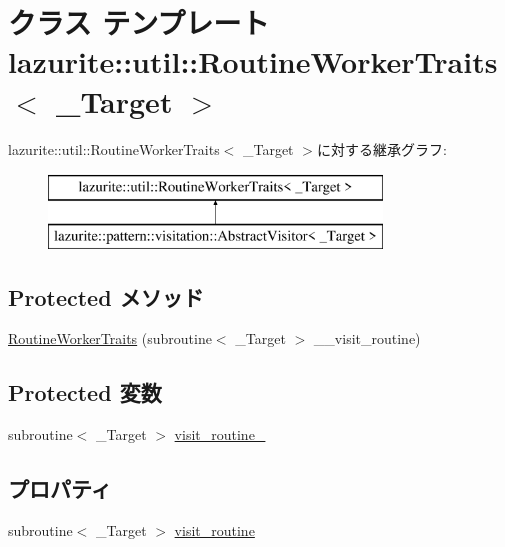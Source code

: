 \hypertarget{classlazurite_1_1util_1_1_routine_worker_traits_3_01___target_01_4}{
\section{クラス テンプレート lazurite::util::RoutineWorkerTraits$<$ \_\-Target $>$}
\label{classlazurite_1_1util_1_1_routine_worker_traits_3_01___target_01_4}
}
lazurite::util::RoutineWorkerTraits$<$ \_\-Target $>$に対する継承グラフ:\begin{figure}[H]
\begin{center}
\leavevmode
\includegraphics[height=2cm]{classlazurite_1_1util_1_1_routine_worker_traits_3_01___target_01_4}
\end{center}
\end{figure}
\subsection*{Protected メソッド}
\begin{DoxyCompactItemize}
\item 
\hyperlink{classlazurite_1_1util_1_1_routine_worker_traits_3_01___target_01_4_ae1c3b92591b64d791b7a2881153cbad4}{RoutineWorkerTraits} (subroutine$<$ \_\-Target $>$ \_\-\_\-visit\_\-routine)
\end{DoxyCompactItemize}
\subsection*{Protected 変数}
\begin{DoxyCompactItemize}
\item 
subroutine$<$ \_\-Target $>$ \hyperlink{classlazurite_1_1util_1_1_routine_worker_traits_3_01___target_01_4_ab9bab0223933a95d8a08f8013beb8312}{visit\_\-routine\_\-}
\end{DoxyCompactItemize}
\subsection*{プロパティ}
\begin{DoxyCompactItemize}
\item 
subroutine$<$ \_\-Target $>$ \hyperlink{classlazurite_1_1util_1_1_routine_worker_traits_3_01___target_01_4_a1e22bc3f89da1f9a397aad0d8b48483a}{visit\_\-routine}
\end{DoxyCompactItemize}


